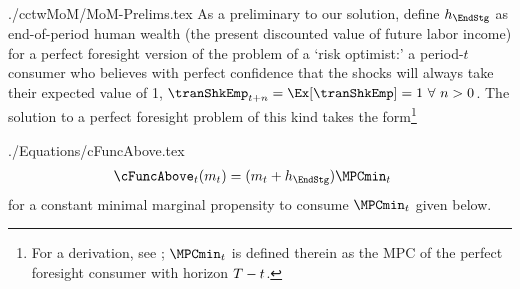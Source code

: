 \documentclass[SolvingMicroDSOPs]{subfiles}
\begin{document}
\begin{verbatimwrite}{./cctwMoM/MoM-Prelims.tex}
  As a preliminary to our solution, define $\hNrm_{\EndStg}$ as end-of-period human wealth (the present discounted value of future labor income) for a perfect foresight version of the problem of a `risk optimist:' a period-$t$ consumer who believes with perfect confidence that the shocks will always take their expected value of   {1, $\tranShkEmp_{t+n} = \Ex[\tranShkEmp]=1~\forall~n>0$.}  The solution to a perfect foresight problem of this kind takes the form\footnote{For a derivation, see \cite{BufferStockTheory}; $\MPCmin_{\prd}$ is defined therein as the MPC of the perfect foresight consumer with horizon $T-t$.}
\end{verbatimwrite}
\unskip
\begin{verbatimwrite}{./Equations/cFuncAbove.tex}
  \begin{equation}\begin{gathered}\begin{aligned}
        \cFuncAbove_{\prd}(\mNrm_{\prd})  & = (\mNrm_{\prd} + \hNrm_{\EndStg})\MPCmin_{\prd} \label{eq:cFuncAbove}
      \end{aligned}\end{gathered}\end{equation}
  for a constant minimal marginal propensity to consume $\MPCmin_{\prd}$ given below.
\end{verbatimwrite}
\unskip
\end{document}
